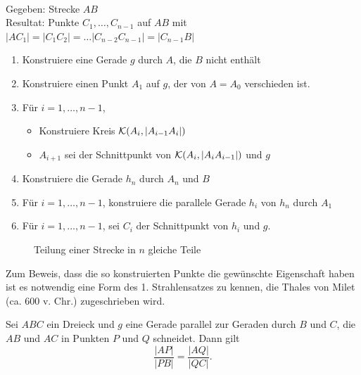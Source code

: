 \begin{konst}\ \\
    Gegeben: Strecke $AB$\\
    Resultat: Punkte $C_1, \dots, C_{n-1}$ auf $AB$ mit $|AC_1|=|C_1C_2|=\dots |C_{n-2} C_{n-1}| =
    |C_{n-1} B|$
    \renewcommand{\labelenumi}{\arabic{enumi}.} %
    \begin{enumerate}
        \item Konstruiere eine Gerade $g$ durch $A$, die $B$ nicht enthält
        \item Konstruiere einen Punkt $A_1$ auf $g$, der von $A=A_0$ verschieden ist.
        \item Für $i=1, \dots, {n-1}$,
        \begin{itemize}
            \item Konstruiere Kreis ${\mathcal K}(A_i, |A_{i-1} A_i|)$
            \item $A_{i+1}$ sei der Schnittpunkt von ${\mathcal K}(A_i, |A_{i} A_{i-1}|)$ und $g$
        \end{itemize}
        \item Konstruiere die Gerade $h_n$ durch $A_n$ und $B$
        \item Für $i=1,\dots, {n-1}$, konstruiere die parallele Gerade $h_i$ von $h_n$ durch $A_1$
        \item Für $i=1, \ldots, {n-1}$, sei $C_i$ der Schnittpunkt von $h_i$ und $g$.
    \end{enumerate}
\end{konst}

\begin{figure}[h]
    
    \caption{Teilung einer Strecke in $n$ gleiche Teile}
\end{figure}

Zum Beweis, dass die so konstruierten Punkte die gewünschte Eigenschaft haben ist es notwendig eine
Form des 1. Strahlensatzes zu kennen, die Thales von Milet (ca. 600 v. Chr.) zugeschrieben wird.

\begin{thm}[Strahlensatz]\label{thm:strahlensatz}
    Sei $ABC$ ein Dreieck und $g$ eine Gerade parallel zur Geraden durch $B$ und $C$, die $AB$ und
    $AC$ in Punkten $P$ und $Q$ schneidet. Dann gilt
    $$
        \frac{|AP|}{|PB|} = \frac{|AQ|}{|QC|}.
    $$
\end{thm}

